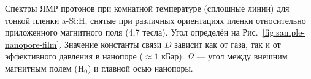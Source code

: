 Спектры ЯМР протонов при комнатной температуре (сплошные линии)
для тонкой пленки a-Si:H,
снятые при различных ориентациях пленки относительно приложенного магнитного поля (4,7 тесла).
Угол определён на  Рис.~\ref{fig:sample-nanopore-film}.
Значение константы связи $D$ зависит как от газа,
так и от эффективного давления в нанопоре ($\approx 1$ кБар).
$\Omega$ --- угол между внешним магнитным полем (H$_0$) и главной осью нанопоры.

